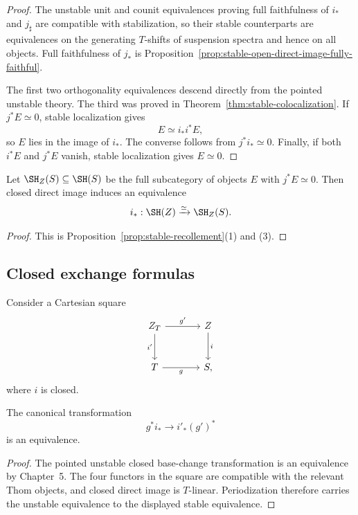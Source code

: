 \begin{proof}
The unstable unit and counit equivalences proving full faithfulness of $i_*$ and $j_\sharp$ are
compatible with stabilization, so their stable counterparts are equivalences on the generating
$T$-shifts of suspension spectra and hence on all objects.  Full faithfulness of $j_*$ is
Proposition~\ref{prop:stable-open-direct-image-fully-faithful}.

The first two orthogonality equivalences descend directly from the pointed unstable theory.  The
third was proved in Theorem~\ref{thm:stable-colocalization}.  If $j^*E\simeq0$, stable localization gives
\[
    E\simeq i_*i^*E,
\]
so $E$ lies in the image of $i_*$.  The converse follows from $j^*i_*\simeq0$.  Finally, if both
$i^*E$ and $j^*E$ vanish, stable localization gives $E\simeq0$.
\end{proof}

\begin{corollary}[Support]
\label{cor:stable-support}
Let $\SH_Z(S)\subseteq\SH(S)$ be the full subcategory of objects $E$ with $j^*E\simeq0$.  Then
closed direct image induces an equivalence
\[
    i_*:\SH(Z)\xrightarrow{\simeq}\SH_Z(S).
\]
\end{corollary}

\begin{proof}
This is Proposition~\ref{prop:stable-recollement}(1) and (3).
\end{proof}

\subsection{Closed exchange formulas}

Consider a Cartesian square
\[
\begin{tikzcd}[column sep=large,row sep=large]
    Z_T \arrow[r,"g'"] \arrow[d,"i'"']
        & Z \arrow[d,"i"] \\
    T \arrow[r,"g"'] & S,
\end{tikzcd}
\]
where $i$ is closed.

\begin{theorem}
\label{thm:stable-closed-base-change}
The canonical transformation
\[
    g^*i_*
    \longrightarrow
    i'_*(g')^*
\]
is an equivalence.
\end{theorem}

\begin{proof}
The pointed unstable closed base-change transformation is an equivalence by Chapter~5.  The four
functors in the square are compatible with the relevant Thom objects, and closed direct image is
$T$-linear.  Periodization therefore carries the unstable equivalence to the displayed stable
equivalence.
\end{proof}

